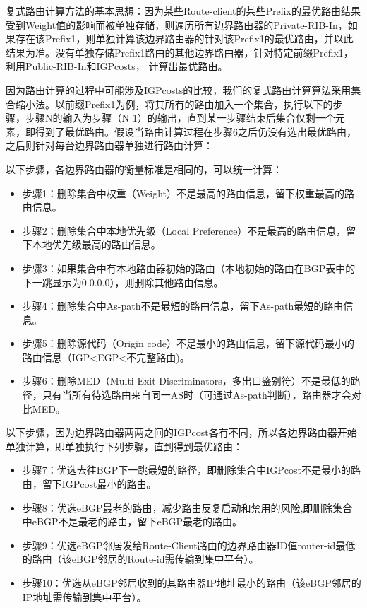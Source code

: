 复式路由计算方法的基本思想：因为某些Route-client的某些Prefix的最优路由结果受到Weight值的影响而被单独存储，则遍历所有边界路由器的Private-RIB-In，如果存在该Prefix1，则单独计算该边界路由器的针对该Prefix1的最优路由，并以此结果为准。没有单独存储Prefix1路由的其他边界路由器，针对特定前缀Prefix1，利用Public-RIB-In和IGPcosts， 计算出最优路由。

因为路由计算的过程中可能涉及IGPcosts的比较，我们的复式路由计算算法采用集合缩小法。以前缀Prefix1为例，将其所有的路由加入一个集合，执行以下的步骤，步骤N的输入为步骤（N-1）的输出，直到某一步骤结束后集合仅剩一个元素，即得到了最优路由。假设当路由计算过程在步骤6之后仍没有选出最优路由，之后则针对每台边界路由器单独进行路由计算：

以下步骤，各边界路由器的衡量标准是相同的，可以统一计算：
\begin{itemize}
    \item 步骤1：删除集合中权重（Weight）不是最高的路由信息，留下权重最高的路由信息。
    \item 步骤2：删除集合中本地优先级（Local Preference）不是最高的路由信息，留下本地优先级最高的路由信息。
    \item 步骤3：如果集合中有本地路由器初始的路由（本地初始的路由在BGP表中的下一跳显示为0.0.0.0），则删除其他路由信息。
    \item 步骤4：删除集合中As-path不是最短的路由信息，留下As-path最短的路由信息。
    \item 步骤5：删除源代码（Origin code）不是最小的路由信息，留下源代码最小的路由信息（IGP<EGP<不完整路由)。
    \item 步骤6：删除MED（Multi-Exit Discriminators，多出口鉴别符）不是最低的路径，只有当所有待选路由来自同一AS时（可通过As-path判断），路由器才会对比MED。
\end{itemize}


以下步骤，因为边界路由器两两之间的IGPcost各有不同，所以各边界路由器开始单独计算，即单独执行下列步骤，直到得到最优路由：
\begin{itemize}
    \item 步骤7：优选去往BGP下一跳最短的路径，即删除集合中IGPcost不是最小的路由，留下IGPcost最小的路由。
    \item 步骤8：优选eBGP最老的路由，减少路由反复启动和禁用的风险,即删除集合中eBGP不是最老的路由，留下eBGP最老的路由。
    \item 步骤9：优选eBGP邻居发给Route-Client路由的边界路由器ID值router-id最低的路由（该eBGP邻居的Route-id需传输到集中平台）。
    \item 步骤10：优选从eBGP邻居收到的其路由器IP地址最小的路由（该eBGP邻居的IP地址需传输到集中平台）。
\end{itemize}


